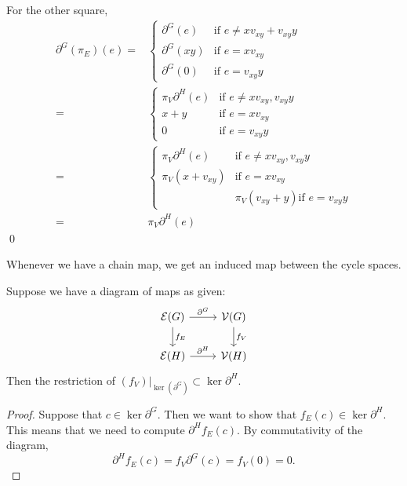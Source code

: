     For the other square,
    \begin{align*}
    \partial^G(\pi_E)(e)=&\left\{\begin{array}{ll} \partial^G(e) & \text{if $e\neq xv_{xy}+v_{xy}y $}\\  \partial^G(xy) & \text{if $e=xv_{xy}$}\\  \partial^G(0) & \text{if $e=v_{xy}y$}\end{array}\right.\\
    =&\left\{\begin{array}{ll}
     \pi_V \partial^H(e) & \text{if $e\neq xv_{xy},v_{xy}y $}\\ 
    x+y & \text{if $e=xv_{xy}$}\\ 
    0 & \text{if $e=v_{xy}y$}\end{array}\right.\\
    =&\left\{\begin{array}{ll}
     \pi_V \partial^H(e) & \text{if $e\neq xv_{xy},v_{xy}y $}\\ 
    \pi_V(x+v_{xy}) & \text{if $e=xv_{xy}$}\\ 
     & \pi_V(v_{xy}+y)\text{if $e=v_{xy}y$}\end{array}\right.\\
    =& \pi_V \partial^H(e)
    \end{align*}
    \qed
    
    \noindent Whenever we have a chain map, we get an induced map between the cycle spaces. 
    \begin{lemma}
        Suppose we have a diagram of maps as given:
        \[\begin{tikzcd}
        \mathcal E(G)\arrow{r}{\partial^G} \arrow{d}{f_E} & \mathcal V(G) \arrow{d}{f_V}\\
        \mathcal E(H)\arrow{r}{\partial^H} & \mathcal V(H)
        \end{tikzcd}\]
        Then the restriction of $(f_V)|_{\ker(\partial^G)}\subset \ker \partial^H$.
    \end{lemma}
    \begin{proof}
    Suppose that $c\in \ker \partial^G$. Then we want to show that $f_E(c)\in \ker \partial^H$. This means that we need to compute $\partial^Hf_E(c)$. By commutativity of the diagram, 
    \[
    \partial^Hf_E(c) = f_V \partial^G(c)
    = f_V(0)=0. \]
    \end{proof}